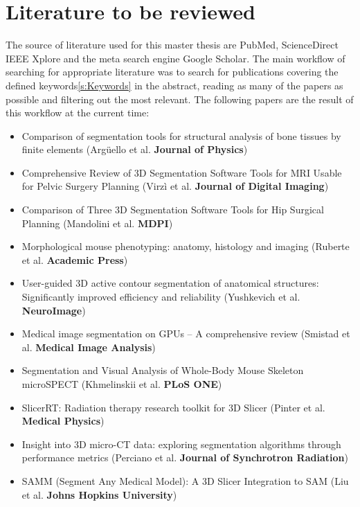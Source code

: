 \section{Literature to be reviewed}
\begin{body}
	The source of literature used for this master thesis are PubMed, ScienceDirect IEEE Xplore and the meta search engine Google Scholar.
	The main workflow of searching for appropriate literature was to search for publications covering the defined keywords\ref{s:Keywords} in the abstract, reading as many of the papers as possible and filtering out the most relevant.
	The following papers are the result of this workflow at the current time:
	\begin{itemize}
		\item[\ding{108}] Comparison of segmentation tools for structural analysis of bone tissues by finite elements (Argüello et al. \textsf{\textbf{Journal of Physics}})
		\item[\ding{108}] Comprehensive Review of 3D Segmentation Software Tools for MRI Usable for Pelvic Surgery Planning (Virzì et al. \textsf{\textbf{Journal of Digital Imaging}})
		\item[\ding{108}] Comparison of Three 3D Segmentation Software Tools for Hip Surgical Planning (Mandolini et al. \textsf{\bfseries{MDPI}})
		\item[\ding{108}] Morphological mouse phenotyping: anatomy, histology and imaging (Ruberte et al. \textsf{\bfseries{Academic Press}})
		\item[\ding{108}] User-guided 3D active contour segmentation of anatomical structures: Significantly improved efficiency and reliability (Yushkevich et al. \textsf{\bfseries{NeuroImage}})
		\item[\ding{108}] Medical image segmentation on GPUs – A comprehensive review (Smistad et al. \textsf{\bfseries{Medical Image Analysis}})
		\item[\ding{108}] Segmentation and Visual Analysis of Whole-Body Mouse Skeleton microSPECT (Khmelinskii et al. \textsf{\bfseries{PLoS ONE}})
		\item[\ding{108}] SlicerRT: Radiation therapy research toolkit for 3D Slicer (Pinter et al. \textsf{\bfseries{Medical Physics}})
		\item[\ding{108}] Insight into 3D micro-CT data: exploring segmentation algorithms through performance metrics (Perciano et al. \textsf{\bfseries{Journal of Synchrotron Radiation}})
		\item[\ding{108}] SAMM (Segment Any Medical Model): A 3D Slicer Integration to SAM (Liu et al. \textsf{\bfseries{Johns Hopkins University}})

	\end{itemize}
\end{body}


